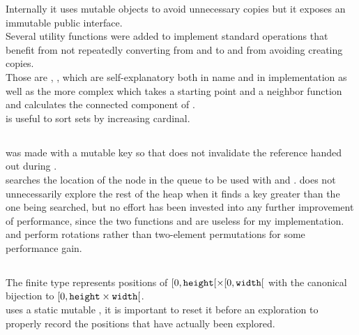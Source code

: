 Internally it uses mutable objects to avoid unnecessary copies but it exposes
an immutable public interface.\\

Several utility functions were added to implement standard operations that benefit
from not repeatedly converting from and to  and from avoiding creating
copies.\\
Those are , ,  which are self-explanatory
both in name and in implementation as well as the more complex
 which takes a starting point and a 
neighbor function and calculates the connected component of .\\
 is useful to sort sets by increasing cardinal.


\subsection{}

 was made with a mutable key so that  does
not invalidate the reference handed out during .\\
 searches the location of the node in the queue to be used with
 and .  does not unnecessarily explore
the rest of the heap when it finds a key greater than the one being searched,
but no effort has been invested into any further improvement of performance,
since the two functions  and  are useless for
my implementation.\\

 and  perform rotations rather than two-element permutations
for some performance gain.\\


\subsection{}

The finite type represents positions of \([0,\texttt{height}[ \times [0,\texttt{width}[\)
with the canonical bijection to \([0, \texttt{height}\times\texttt{width}[\).\\

 uses a static mutable , it is important to reset it before
an exploration to properly record the positions that have actually been explored.\\

